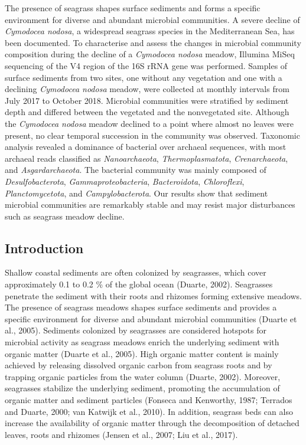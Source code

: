 \documentclass[12pt,]{article}
\begin{document}
The presence of seagrass shapes surface sediments and forms a specific
environment for diverse and abundant microbial communities. A severe
decline of \emph{Cymodocea nodosa}, a widespread seagrass species in the
Mediterranean Sea, has been documented. To characterise and assess the
changes in microbial community composition during the decline of a
\emph{Cymodocea nodosa} meadow, Illumina MiSeq sequencing of the V4
region of the 16S rRNA gene was performed. Samples of surface sediments
from two sites, one without any vegetation and one with a declining
\emph{Cymodocea nodosa} meadow, were collected at monthly intervals from
July 2017 to October 2018. Microbial communities were stratified by
sediment depth and differed between the vegetated and the nonvegetated
site. Although the \emph{Cymodocea nodosa} meadow declined to a point
where almost no leaves were present, no clear temporal succession in the
community was observed. Taxonomic analysis revealed a dominance of
bacterial over archaeal sequences, with most archaeal reads classified
as \emph{Nanoarchaeota}, \emph{Thermoplasmatota}, \emph{Crenarchaeota},
and \emph{Asgardarchaeota}. The bacterial community was mainly composed
of \emph{Desulfobacterota}, \emph{Gammaproteobacteria},
\emph{Bacteroidota}, \emph{Chloroflexi}, \emph{Planctomycetota}, and
\emph{Campylobacterota}. Our results show that sediment microbial
communities are remarkably stable and may resist major disturbances such
as seagrass meadow decline.

\newpage

\hypertarget{introduction}{%
\subsection{Introduction}\label{introduction}}

Shallow coastal sediments are often colonized by seagrasses, which cover
approximately 0.1 to 0.2 \% of the global ocean (Duarte, 2002).
Seagrasses penetrate the sediment with their roots and rhizomes forming
extensive meadows. The presence of seagrass meadows shapes surface
sediments and provides a specific environment for diverse and abundant
microbial communities (Duarte et al., 2005). Sediments colonized by
seagrasses are considered hotspots for microbial activity as seagrass
meadows enrich the underlying sediment with organic matter (Duarte et
al., 2005). High organic matter content is mainly achieved by releasing
dissolved organic carbon from seagrass roots and by trapping organic
particles from the water column (Duarte, 2002). Moreover, seagrasses
stabilize the underlying sediment, promoting the accumulation of organic
matter and sediment particles (Fonseca and Kenworthy, 1987; Terrados and
Duarte, 2000; van Katwijk et al., 2010). In addition, seagrass beds can
also increase the availability of organic matter through the
decomposition of detached leaves, roots and rhizomes (Jensen et al.,
2007; Liu et al., 2017).
\end{document}
